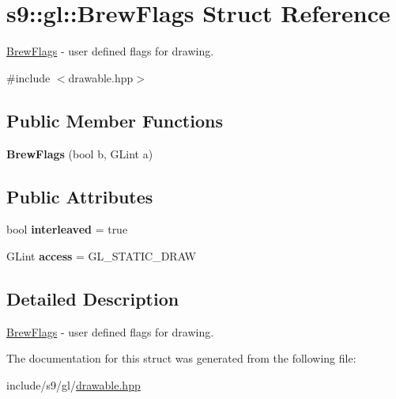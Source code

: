 \hypertarget{structs9_1_1gl_1_1BrewFlags}{\section{s9\-:\-:gl\-:\-:\-Brew\-Flags \-Struct \-Reference}
\label{structs9_1_1gl_1_1BrewFlags}
}


\hyperlink{structs9_1_1gl_1_1BrewFlags}{\-Brew\-Flags} -\/ user defined flags for drawing.  




{\ttfamily \#include $<$drawable.\-hpp$>$}

\subsection*{\-Public \-Member \-Functions}
\begin{DoxyCompactItemize}
\item 
\hypertarget{structs9_1_1gl_1_1BrewFlags_a8f20f1596ca40dad59a6d5ea9cb0e355}{{\bfseries \-Brew\-Flags} (bool b, \-G\-Lint a)}\label{structs9_1_1gl_1_1BrewFlags_a8f20f1596ca40dad59a6d5ea9cb0e355}

\end{DoxyCompactItemize}
\subsection*{\-Public \-Attributes}
\begin{DoxyCompactItemize}
\item 
\hypertarget{structs9_1_1gl_1_1BrewFlags_a1fa68bb0fd7f35028a713ab0e2d0ba12}{bool {\bfseries interleaved} = true}\label{structs9_1_1gl_1_1BrewFlags_a1fa68bb0fd7f35028a713ab0e2d0ba12}

\item 
\hypertarget{structs9_1_1gl_1_1BrewFlags_a630a185fcd8038fb6c3b3669fb2e169b}{\-G\-Lint {\bfseries access} = \-G\-L\-\_\-\-S\-T\-A\-T\-I\-C\-\_\-\-D\-R\-A\-W}\label{structs9_1_1gl_1_1BrewFlags_a630a185fcd8038fb6c3b3669fb2e169b}

\end{DoxyCompactItemize}


\subsection{\-Detailed \-Description}
\hyperlink{structs9_1_1gl_1_1BrewFlags}{\-Brew\-Flags} -\/ user defined flags for drawing. 

\-The documentation for this struct was generated from the following file\-:\begin{DoxyCompactItemize}
\item 
include/s9/gl/\hyperlink{drawable_8hpp}{drawable.\-hpp}\end{DoxyCompactItemize}
